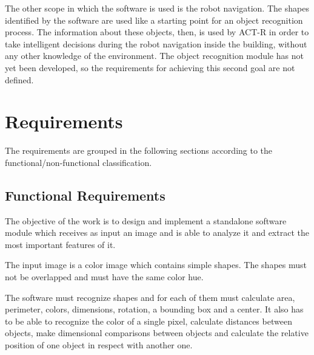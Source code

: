 	The other scope in which the software is used is the robot navigation. 
	The shapes identified by the software are used like a starting point for an object recognition process. 
	The information about these objects, then, is used by ACT-R in order to take intelligent decisions during the robot navigation inside the building, without any other knowledge of the environment. The object recognition module has not yet been developed, so the requirements for achieving this second goal are not defined. 

\begin{comment}
	The feature recognition, in particular, will be used by ACT-R in order to recognize objects starting from the simple shapes recognized by the software
 further use of the software is that the feature extraction process that is going to be implemented is used like an object recognition to be used during the robot navigation inside a building. 
\end{comment}	

	\section{Requirements}
	The requirements are grouped in the following sections according to the functional/non-functional classification. 

		\subsection{Functional Requirements}
		The objective of the work is to design and implement a standalone software module which receives as input an image and is able to analyze it and extract the most important features of it.

		The input image is a color image which contains simple shapes. The shapes must not be overlapped and must have the same color hue.

		The software must recognize shapes and for each of them must calculate area, perimeter, colors, dimensions, rotation, a bounding box and a center. It also has to be able to recognize the color of a single pixel, calculate distances between objects, make dimensional comparisons between objects and calculate the relative position of one object in respect with another one.

